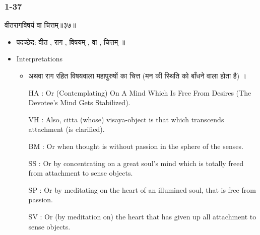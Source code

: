 \begin{frame}[fragile]\frametitle{1-37}
\begin{sanskrit}
वीतरागविषयं वा चित्तम्॥३७॥
\end{sanskrit}

	\begin{itemize}
	\item पदच्छेद: वीत , राग , विषयम् , वा , चित्तम् ॥
	\item Interpretations
		\begin{itemize}	
		\item अथवा राग रहित विषयवाला महापुरुषों का चित्त (मन की स्थिति को बाँधने वाला होता है) ।
		\item [HA]: Or (Contemplating) On A Mind Which Is Free From Desires (The Devotee’s Mind Gets Stabilized).
		\item [VH]: Also, citta (whose) visaya-object is that which transcends attachment (is clarified).
		\item [BM]: Or when thought is without passion in the sphere of the senses.
		\item [SS]: Or by concentrating on a great soul’s mind which is totally freed from attachment to sense objects.
		\item [SP]: Or by meditating on the heart of an illumined soul, that is free from passion.
		\item [SV]: Or (by meditation on) the heart that has given up all attachment to sense objects. 
		\end{itemize}
	\end{itemize}
	
\end{frame}



